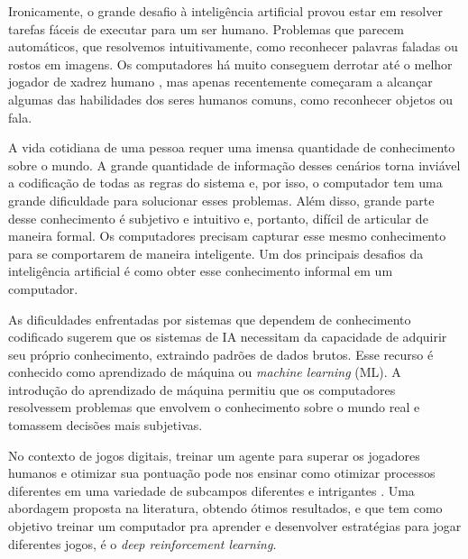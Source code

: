 Ironicamente, o grande desafio à inteligência artificial provou estar em resolver tarefas fáceis de executar para um ser humano. Problemas  que parecem automáticos, que resolvemos intuitivamente, como reconhecer palavras faladas ou rostos em imagens. Os computadores há muito conseguem derrotar até o melhor jogador de xadrez humano \cite{Hsu:2002:BDB:601291}, mas apenas recentemente começaram a alcançar algumas das habilidades dos seres humanos comuns, como reconhecer objetos ou fala. 

A vida cotidiana de uma pessoa requer uma imensa quantidade de conhecimento sobre o mundo. A grande quantidade de informação desses cenários torna inviável a codificação de todas as regras do sistema e, por isso, o computador tem uma grande dificuldade para solucionar esses problemas. Além disso, grande parte desse conhecimento é subjetivo e intuitivo e, portanto, difícil de articular de maneira formal. Os computadores precisam capturar esse mesmo conhecimento para se comportarem de maneira inteligente. Um dos principais desafios da inteligência artificial é como obter esse conhecimento informal em um computador.

As dificuldades enfrentadas por sistemas que dependem de conhecimento codificado sugerem que os sistemas de IA necessitam da capacidade de adquirir seu próprio conhecimento, extraindo padrões de dados brutos. Esse recurso é conhecido como aprendizado de máquina ou \textit{machine learning} (ML). A introdução do aprendizado de máquina permitiu que os computadores resolvessem problemas que envolvem o conhecimento sobre o mundo real e tomassem decisões mais subjetivas.

 No contexto de jogos digitais, treinar um agente para superar os jogadores humanos e otimizar sua pontuação pode nos ensinar como otimizar processos diferentes em uma variedade de subcampos diferentes e intrigantes \cite{comi:teach:AI:DRL:2018}. Uma abordagem proposta na literatura, obtendo ótimos resultados, e que tem como objetivo treinar um computador pra aprender e desenvolver estratégias para jogar diferentes jogos, é o \textit{deep reinforcement learning}.

